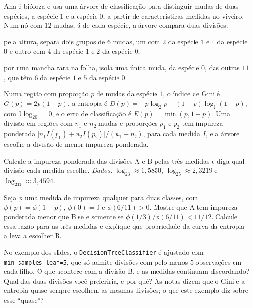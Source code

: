 Ana é bióloga e usa uma árvore de classificação para distinguir mudas de duas espécies, a
espécie $1$ e a espécie $0$, a partir de características medidas no viveiro. Num nó com $12$
mudas, $6$ de cada espécie, a árvore compara duas divisões:
\begin{description}[leftmargin=1.4cm,style=nextline]
  \item[A] pela altura, separa dois grupos de $6$ mudas, um com $2$ da espécie $1$ e $4$ da
        espécie $0$ e outro com $4$ da espécie $1$ e $2$ da espécie $0$;
  \item[B] por uma mancha rara na folha, isola uma única muda, da espécie $0$, das outras $11$,
        que têm $6$ da espécie $1$ e $5$ da espécie $0$.
\end{description}
Numa região com proporção $p$ de mudas da espécie $1$, o índice de Gini é $G(p)=2p(1-p)$, a
entropia é $D(p)=-p\log_2p-(1-p)\log_2(1-p)$, com $0\log_20=0$, e o erro de classificação é
$E(p)=\min(p,1-p)$. Uma divisão em regiões com $n_1$ e $n_2$ mudas e proporções $p_1$ e $p_2$
tem impureza ponderada $\big[n_1I(p_1)+n_2I(p_2)\big]/(n_1+n_2)$, para cada medida $I$, e a
árvore escolhe a divisão de menor impureza ponderada.
\begin{itens}
  \item {} Calcule a impureza ponderada das divisões A e B pelas três medidas e diga
        qual divisão cada medida escolhe. \emph{Dados:} $\log_23\approx1{,}5850$,
        $\log_25\approx2{,}3219$ e $\log_211\approx3{,}4594$.
  \item {} Seja $\phi$ uma medida de impureza qualquer para duas classes, com
        $\phi(p)=\phi(1-p)$, $\phi(0)=0$ e $\phi(6/11)>0$. Mostre que A tem impureza ponderada
        menor que B se e somente se $\phi(1/3)/\phi(6/11)<11/12$. Calcule essa razão para as
        três medidas e explique que propriedade da curva da entropia a leva a escolher B.
  \item {} No exemplo dos slides, o \texttt{DecisionTreeClassifier} é ajustado com
        \texttt{min\_samples\_leaf=5}, que só admite divisões com pelo menos $5$
        observações em cada filho. O que acontece com a divisão B,
        e as medidas continuam discordando? Qual das duas divisões você preferiria, e por quê?
        As notas dizem que o Gini e a entropia quase sempre escolhem as mesmas divisões; o que
        este exemplo diz sobre esse ``quase''?
\end{itens}

